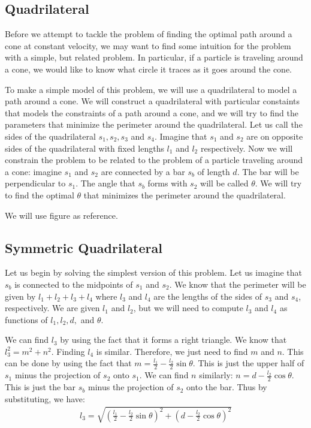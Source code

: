 \subsection{Quadrilateral}

Before we attempt to tackle the problem of finding the optimal path around a cone at constant velocity, we may want to find some intuition for the problem with a simple, but related problem. In particular, if a particle is traveling around a cone, we would like to know what circle it traces as it goes around the cone.

To make a simple model of this problem, we will use a quadrilateral to model a path around a cone. We will construct a quadrilateral with particular constaints that models the constraints of a path around a cone, and we will try to find the parameters that minimize the perimeter around the quadrilateral. Let us call the sides of the quadrilateral $s_1, s_2, s_3$ and $s_4$. Imagine that $s_1$ and $s_2$ are on opposite sides of the quadrilateral with fixed lengths $l_1$ and $l_2$ respectively. Now we will constrain the problem to be related to the problem of a particle traveling around a cone: imagine $s_1$ and $s_2$ are connected by a bar $s_b$ of length $d$. The bar will be perpendicular to $s_1$. The angle that $s_b$ forms with $s_2$ will be called $\theta$. We will try to find the optimal $\theta$ that minimizes the perimeter around the quadrilateral.

We will use figure \label{fig:quadrilateral} as reference.


\subsection{Symmetric Quadrilateral}

Let us begin by solving the simplest version of this problem. Let us imagine that $s_b$ is connected to the midpoints of $s_1$ and $s_2$. We know that the perimeter will be given by $l_1 + l_2 + l_3 + l_4$ where $l_3$ and $l_4$ are the lengths of the sides of $s_3$ and $s_4$, respectively. We are given $l_1$ and $l_2$, but we will need to compute $l_3$ and $l_4$ as functions of $l_1, l_2,d, $ and $\theta$. 

We can find $l_3$ by using the fact that it forms a right triangle. We know that $l_3^2 = m^2 + n^2$. Finding $l_4$ is similar. Therefore, we just need to find $m$ and $n$. This can be done by using the fact that $m = \frac{l_1}{2} - \frac{l_2}{2} \sin \theta$. This is just the upper half of $s_1$ minus the projection of $s_2$ onto $s_1$. We can find $n$ similarly: $n = d - \frac{l_2}{2} \cos \theta$. This is just the bar $s_b$ minus the projection of $s_2$ onto the bar. Thus by substituting, we have:
\begin{eqnarray}
  l_3 = \sqrt{ \left(\frac{l_1}{2} - \frac{l_2}{2} \sin \theta \right)^2 + \left( d - \frac{l_2}{2} \cos \theta \right)^2 }
\end{eqnarray}

